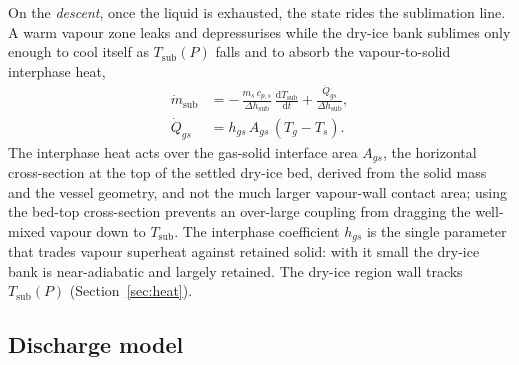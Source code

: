 \documentclass[5p,authoryear]{elsarticle}
\begin{document}
On the \emph{descent}, once the liquid is exhausted, the state rides the sublimation line. A warm
vapour zone leaks and depressurises while the dry-ice bank sublimes only enough to cool itself as
$T_\text{sub}(P)$ falls and to absorb the vapour-to-solid interphase heat,
\begin{equation}
\label{eq:descent}
\begin{aligned}
\dot m_\text{sub} &= -\,\frac{m_s\,c_{p,s}}{\Delta h_\text{sub}}\,\frac{\mathrm{d}T_\text{sub}}{\mathrm{d}t}
                  + \frac{\dot Q_{gs}}{\Delta h_\text{sub}}, \\
\dot Q_{gs} &= h_{gs}\,A_{gs}\,(T_g - T_s).
\end{aligned}
\end{equation}
The interphase heat acts over the gas-solid interface area $A_{gs}$, the horizontal cross-section
at the top of the settled dry-ice bed, derived from the solid mass and the vessel geometry, and
not the much larger vapour-wall contact area; using the bed-top cross-section prevents an
over-large coupling from dragging the well-mixed vapour down to $T_\text{sub}$. The interphase
coefficient $h_{gs}$ is the single parameter that trades vapour superheat against retained solid:
with it small the dry-ice bank is near-adiabatic and largely retained. The dry-ice region wall
tracks $T_\text{sub}(P)$ (Section~\ref{sec:heat}).

\subsection{Discharge model}
\label{sec:discharge}
\end{document}
